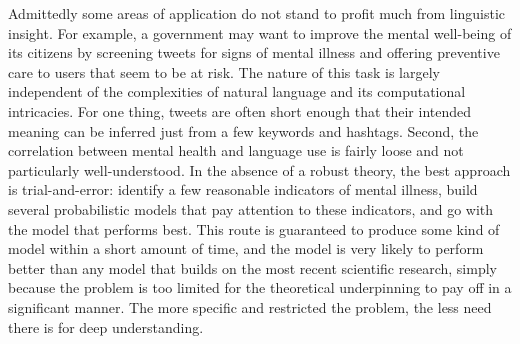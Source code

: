 Admittedly some areas of application do not stand to profit much from linguistic insight.
For example, a government may want to improve the mental well-being of its citizens by screening tweets for signs of mental illness and offering preventive care to users that seem to be at risk.
The nature of this task is largely independent of the complexities of natural language and its computational intricacies.
For one thing, tweets are often short enough that their intended meaning can be inferred just from a few keywords and hashtags.
Second, the correlation between mental health and language use is fairly loose and not particularly well-understood.
In the absence of a robust theory, the best approach is trial-and-error: identify a few reasonable indicators of mental illness, build several probabilistic models that pay attention to these indicators, and go with the model that performs best.
This route is guaranteed to produce some kind of model within a short amount of time, and the model is very likely to perform better than any model that builds on the most recent scientific research, simply because the problem is too limited for the theoretical underpinning to pay off in a significant manner.
The more specific and restricted the problem, the less need there is for deep understanding.

